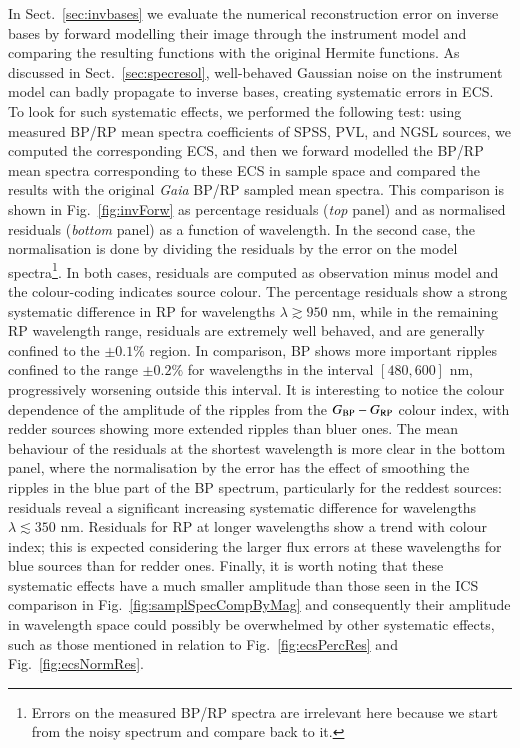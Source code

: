 \documentclass{aa}
\newcommand{\gaia}{\textit{Gaia}\xspace}
\newcommand{\bprp}{\ensuremath{G_{\rm BP}-G_{\rm RP}}\xspace}
\newcommand{\secname}{Sect.}
\newcommand{\secref}[1]{\secname~\ref{sec:#1}}
\newcommand{\figref}[1]{Fig.~\ref{fig:#1}}
\begin{document}
In \secref{invbases} we evaluate the numerical reconstruction error on inverse bases by forward modelling their image through the instrument model and comparing the resulting functions with the original Hermite functions. As discussed in \secref{specresol}, well-behaved Gaussian noise on the instrument model can badly propagate to inverse bases, creating systematic errors in ECS. To look for such systematic effects, we performed the following test: using measured BP/RP mean spectra coefficients of SPSS, PVL, and NGSL sources, we computed the corresponding ECS, and then we forward modelled the BP/RP mean spectra corresponding to these ECS in sample space and compared the results with the original \gaia BP/RP sampled mean spectra. This comparison is shown in \figref{invForw} as percentage residuals (\emph{top} panel) and as normalised residuals (\emph{bottom} panel) as a function of wavelength. In the second case, the normalisation is done by dividing the residuals by the error on the model spectra\footnote{Errors on the measured BP/RP spectra are irrelevant here because we start from the noisy spectrum and compare back to it.}. In both cases, residuals are computed as observation minus model and the colour-coding indicates source colour. The percentage residuals show a strong systematic difference in RP for wavelengths $\lambda\gtrsim950$ nm, while in the remaining RP wavelength range, residuals are extremely well behaved, and are generally confined to the $\pm0.1\%$ region. In comparison, BP shows more important ripples confined to the range $\pm0.2\%$ for wavelengths in the interval $[480, 600]$ nm, progressively worsening outside this interval. It is interesting to notice the colour dependence of the amplitude of the  ripples from the \bprp colour index, with redder sources showing more extended ripples than bluer ones. The mean behaviour of the residuals at the shortest wavelength is more clear in the bottom panel, where the normalisation by the error has the effect of smoothing the ripples in the blue part of the BP spectrum, particularly for the reddest sources: residuals reveal a significant increasing systematic difference for wavelengths $\lambda\lesssim350$ nm. Residuals for RP at longer wavelengths show a trend with colour index; this is expected considering the larger flux errors at these wavelengths for blue sources than for redder ones. Finally, it is worth noting that 
these systematic effects have a much smaller amplitude than those seen in the ICS comparison in \figref{samplSpecCompByMag} and consequently their amplitude in wavelength space could possibly be overwhelmed by other systematic effects, such as those mentioned in relation to 
\figref{ecsPercRes} and \figref{ecsNormRes}.
\end{document}
